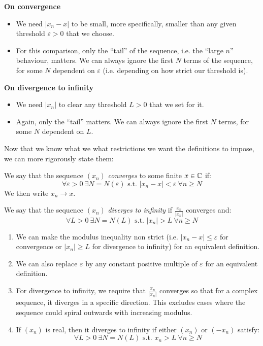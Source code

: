 \documentclass[../main.tex]{subfiles}
\begin{document}
\textbf{On convergence}
\begin{itemize}
  \item We need $|x_n - x|$ to be small, more specifically, smaller than any given threshold $\varepsilon > 0$ that we choose.
  \item For this comparison, only the ``tail'' of the sequence, i.e. the ``large $n$'' behaviour, matters.
    We can always ignore the first $N$ terms of the sequence, for some $N$ dependent on $\varepsilon$ (i.e. depending on how strict our threshold is).
\end{itemize}
\textbf{On divergence to infinity}
\begin{itemize}
  \item We need $|x_n|$ to clear any threshold $L > 0$ that we set for it.
  \item Again, only the ``tail'' matters.
    We can always ignore the first $N$ terms, for some $N$ dependent on $L$.
\end{itemize}
Now that we know what we what restrictions we want the definitions to impose, we can more rigorously state them:
\begin{definition}[Convergence]
  We say that the sequence $(x_n)$ \textit{converges} to some finite $x \in \mathbb{C}$ if:
  \[
    \forall \varepsilon > 0\ \exists N = N(\varepsilon) \text{ s.t. } |x_n - x| < \varepsilon\ \forall n \geq N
  \]
  We then write $x_n \to x$.
\end{definition}
\begin{definition}
  We say that the sequence $(x_n)$ \textit{diverges to infinity} if $\frac{x_n}{|x_n|}$ converges and:
  \[
    \forall L > 0\ \exists N = N(L) \text{ s.t. } |x_n| > L\ \forall n \geq N
  \]
\end{definition}
\begin{remark}[Remarks]
  \begin{enumerate}
    \item We can make the modulus inequality non strict (i.e. $|x_n - x| \leq \varepsilon$ for convergence or $|x_n| \geq L$ for divergence to infinity) for an equivalent definition.
    \item We can also replace $\varepsilon$ by any constant positive multiple of $\varepsilon$ for an equivalent definition.
    \item For divergence to infinity, we require that $\frac{x_n}{|x_n|}$ converges so that for a complex sequence, it diverges in a specific direction.
      This excludes cases where the sequence could spiral outwards with increasing modulus.
    \item If $(x_n)$ is real, then it diverges to infinity if either $(x_n)$ or $(-x_n)$ satisfy:
      \[
        \forall L > 0\ \exists N = N(L) \text{ s.t. } x_n > L\ \forall n \geq N
      \]
  \end{enumerate}
\end{remark}
\end{document}
